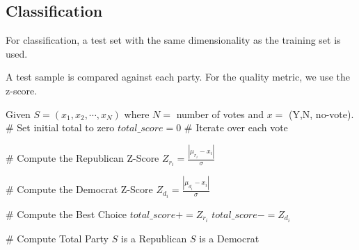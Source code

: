 \documentclass[12pt]{report}
\begin{document}
\clearpage
\subsection*{Classification}

For classification, a test set with the same dimensionality as the training set is used.

A test sample is compared against each party.  For the quality metric, we use the z-score.\\


\begin{algorithmic}
\State
\State Given $S = \left( x_1, x_2, \cdots, x_N \right)$ where $N = $ number of votes and $x = $ (Y,N, no-vote).
\State
\State \# Set initial total to zero
\State $total\_score = 0$
\State
\State \# Iterate over each vote
    
    \State
    \State \# Compute the Republican Z-Score
    \State $Z_{r_i} = \frac{\left|\mu_{r_i} - x_i\right|}{\sigma}$
    
    \State
    \State \# Compute the Democrat Z-Score
    \State $Z_{d_i} = \frac{\left|\mu_{d_i} - x_i\right|}{\sigma}$
    \State

    \State \# Compute the Best Choice
        \State $total\_score += Z_{r_i}$
    \Else
        \State $total\_score -= Z_{d_i}$
    \EndIf


\EndFor
\State
\State \# Compute Total Party
    \State $S$ is a Republican
\Else
    \State $S$ is a Democrat
\EndIf

\end{algorithmic}
\end{document}
